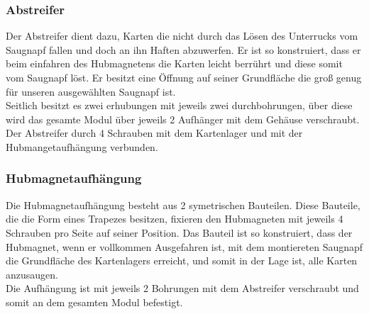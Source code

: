 \subsubsection{Abstreifer}

Der Abstreifer dient dazu, Karten die nicht durch das Lösen des Unterrucks vom Saugnapf fallen und doch an ihn Haften
abzuwerfen. Er ist so konstruiert, dass er beim einfahren des Hubmagnetens die Karten leicht berrührt und diese somit vom
Saugnapf löst. Er besitzt eine Öffnung auf seiner Grundfläche die groß genug für unseren ausgewählten Saugnapf ist.\\
Seitlich besitzt es zwei erhubungen mit jeweils zwei durchbohrungen, über diese wird das gesamte Modul über jeweils 2 Aufhänger
mit dem Gehäuse verschraubt. \\
Der Abstreifer durch 4 Schrauben mit dem Kartenlager und mit der Hubmangetaufhängung verbunden.

\subsubsection{Hubmagnetaufhängung}

Die Hubmagnetaufhängung besteht aus 2 symetrischen Bauteilen. Diese Bauteile, die die Form eines Trapezes besitzen, fixieren den
Hubmagneten mit jeweils 4 Schrauben pro Seite auf seiner Position. Das Bauteil ist so konstruiert, dass der Hubmagnet, wenn er
vollkommen Ausgefahren ist, mit dem montiereten Saugnapf die Grundfläche des Kartenlagers erreicht, und somit in der Lage ist,
alle Karten anzusaugen.\\
Die Aufhängung ist mit jeweils 2 Bohrungen mit dem Abstreifer verschraubt und somit an dem gesamten Modul befestigt.

